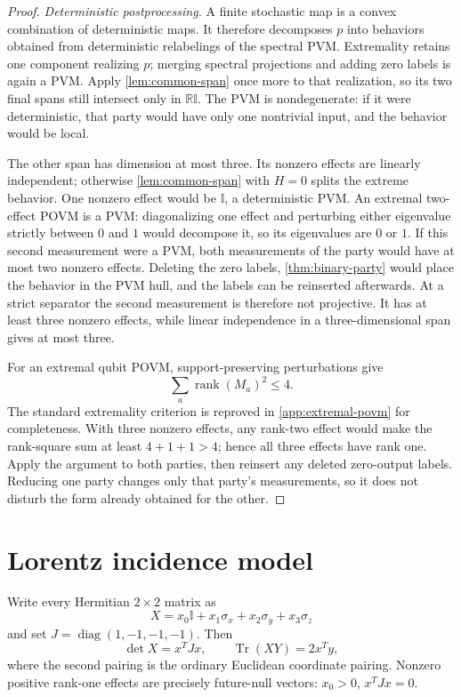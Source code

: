 \documentclass[11pt]{article}
\theoremstyle{definition}
\newcommand{\Tr}{\operatorname{Tr}}
\newcommand{\rank}{\operatorname{rank}}
\newcommand{\id}{\mathbb I}
\newcommand{\R}{\mathbb R}
\begin{document}
\begin{proof}
\emph{Deterministic postprocessing.} A finite stochastic map is a convex
combination of deterministic maps. It therefore decomposes \(p\) into
behaviors obtained from deterministic relabelings of the spectral PVM.
Extremality retains one component realizing \(p\); merging spectral
projections and adding zero labels is again a PVM. Apply
\cref{lem:common-span} once more to that realization, so its two final spans
still intersect only in \(\R\id\). The PVM is nondegenerate: if it were
deterministic, that party would have only one nontrivial input, and the
behavior would be local.

The other span has dimension at most three. Its nonzero effects are linearly
independent; otherwise \cref{lem:common-span} with \(H=0\) splits the extreme
behavior. One nonzero effect would be \(\id\), a deterministic PVM. An
extremal two-effect POVM is a PVM: diagonalizing one effect and perturbing
either eigenvalue strictly between \(0\) and \(1\) would decompose it, so its
eigenvalues are \(0\) or \(1\). If this second measurement were a PVM,
both measurements of the party would have at most two nonzero effects.
Deleting the zero labels, \cref{thm:binary-party} would place the behavior
in the PVM hull, and the labels can be reinserted afterwards. At a strict
separator the second measurement is therefore not projective. It has at
least three nonzero effects, while linear independence in a
three-dimensional span gives at most three.

For an extremal qubit POVM, support-preserving perturbations give
\[
\sum_a\rank(M_a)^2\le4.
\]
The standard extremality criterion \cite{dariano2005,haapasalo2012} is
reproved in \cref{app:extremal-povm} for completeness. With three nonzero
effects, any rank-two effect would make the rank-square sum at least
\(4+1+1>4\); hence all three effects have rank one. Apply the argument to
both parties, then reinsert any deleted zero-output labels. Reducing one
party changes only that party's measurements, so it does not disturb the
form already obtained for the other.
\end{proof}

\section{Lorentz incidence model}
\label{sec:incidence}

Write every Hermitian \(2\times2\) matrix as
\[
X=x_0\id+x_1\sigma_x+x_2\sigma_y+x_3\sigma_z
\]
and set \(J=\operatorname{diag}(1,-1,-1,-1)\). Then
\[
\det X=x^TJx,\qquad
\Tr(XY)=2x^Ty,
\]
where the second pairing is the ordinary Euclidean coordinate pairing.
Nonzero positive rank-one effects are precisely future-null vectors:
\(x_0>0\), \(x^TJx=0\).
\end{document}
